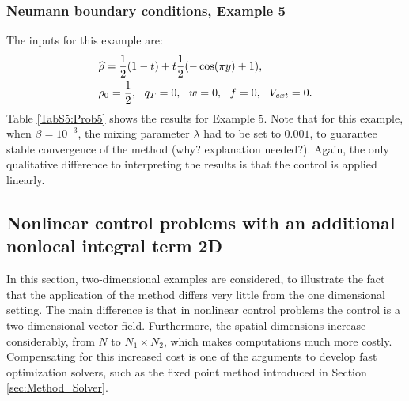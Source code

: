 \subsubsection{Neumann boundary conditions, Example 5}
The inputs for this example are:
\begin{align*}
&\widehat \rho = \frac{1}{2}(1-t) + t\frac{1}{2}(-\cos(\pi y) + 1),\\
&\rho_{0} = \frac{1}{2},\ \
q_{T} = 0,\ \
{w} = 0,\ \
f =0,\ \
V_{ext} =0.
\end{align*}
Table \ref{TabS5:Prob5} shows the results for Example 5. Note that for this example, when $\beta = 10^{-3}$, the mixing parameter $\lambda$ had to be set to $0.001$, to guarantee stable convergence of the method (why? explanation needed?).
Again, the only qualitative difference to interpreting the results is that the control is applied linearly.


\subsection{Nonlinear control problems with an additional nonlocal integral term 2D}
In this section, two-dimensional examples are considered, to illustrate the fact that the application of the method differs very little from the one dimensional setting. The main difference is that in nonlinear control problems the control is a two-dimensional vector field. Furthermore, the spatial dimensions increase considerably, from $N$ to $N_1\times N_2$, which makes computations much more costly. Compensating for this increased cost is one of the arguments to develop fast optimization solvers, such as the fixed point method introduced in Section \ref{sec:Method_Solver}.
